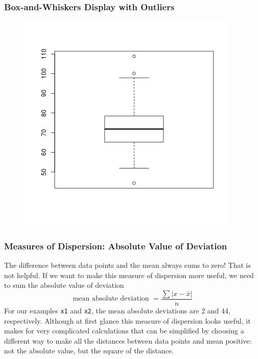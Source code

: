 \documentclass[xcolor=dvipsnames]{beamer}
\begin{document}
\begin{frame}
  \frametitle{Box-and-Whiskers Display with Outliers}
\begin{figure}[h]
\includegraphics[scale=.6]{./diagrams/box1.png}
\end{figure}
\end{frame}

\begin{frame}
  \frametitle{Measures of Dispersion: Absolute Value of Deviation}
The difference between data points and the mean always sums to zero!
That is not helpful. If we want to make this measure of dispersion
more useful, we need to sum the \alert{absolute value of deviation}
\begin{equation}
  \label{eq:riquithu}
  \mbox{mean absolute deviation }=\frac{\sum{}\vert{}x-\bar{x}\vert}{n}
\end{equation}
For our examples \texttt{x1} and \texttt{x2}, the mean absolute
deviations are 2 and 44, respectively. Although at first glance this
measure of dispersion looks useful, it makes for very complicated
calculations that can be simplified by choosing a different way to
make all the distances between data points and mean positive: not the
absolute value, but the square of the distance.
\end{frame}
\end{document}
